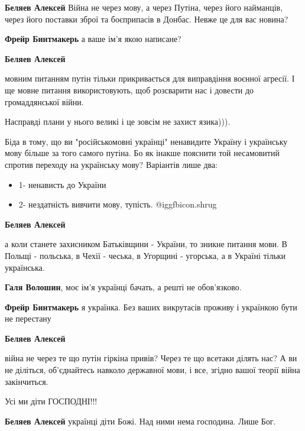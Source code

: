 \begin{itemize}
\begin{itemize}
\textbf{Беляев Алексей}
Війна не через мову, а через Путіна, через його найманців, через його поставки зброї та боєприпасів в Донбас.
Невже це для вас новина?

\textbf{Фрейр Бинтмакерь} а ваше ім'я якою написане?

\textbf{Беляев Алексей} 

мовним питанням путін тільки прикривається для виправдіння воєнної агресії. І
ще мовне питання використовують, щоб розсварити нас і довести до громаддянської
війни.

Насправді плани у нього великі і це зовсім не захист язика))).

Біда в тому, що ви "російськомовні українці" ненавидите Україну і українську
мову більше за того самого путіна. Бо як інакше пояснити той несамовитий
спротив переходу на українську мову? Варіантів лише два:

\begin{itemize}
  \item 1- ненависть до України
  \item 2- нездатність вивчити мову, тупість. @igg{fbicon.shrug} 
\end{itemize}

\textbf{Беляев Алексей} 

а коли станете захисником Батьківщини - України, то зникне питання мови. В
Польщі - польська, в Чехії - чеська, в Угорщині - угорська, а в Україні тільки
українська.

\textbf{Галя Волошин}, моє ім'я українці бачать, а решті не обов'язково.

\textbf{Фрейр Бинтмакерь} я українка. Без ваших викрутасів проживу і українкою бути не перестану

\textbf{Беляев Алексей} 

війна не через те що путін гіркіна привів? Через те що всетаки ділять нас? А ви
не діліться, об'єднайтесь навколо державної мови, і все, згідно вашої теорії війна
закінчиться.

\end{itemize} %

Усі ми діти ГОСПОДНІ!!!

\begin{itemize} %
\textbf{Беляев Алексей} українці діти Божі. Над ними нема господина. Лише Бог.
\end{itemize} %


\end{itemize}
